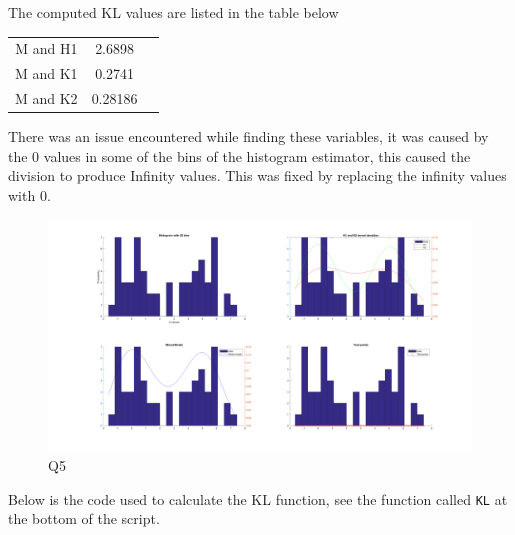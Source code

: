 The computed KL values are listed in the table below
\begin{center}
    \begin{tabular}{|c|c|c|}
        \hline
        M and H1 & 2.6898 \\
        M and K1 & 0.2741  \\
        M and K2 & 0.28186 \\
        \hline
    \end{tabular}
\end{center}

There was an issue encountered while finding these variables, it was caused by the 0 values in some of the bins of the histogram estimator, this caused the division to produce Infinity values. This was fixed by replacing the infinity values with 0.

\begin{figure}[H]
    \includegraphics[width=\linewidth]{../../pracs/week4/images/q5}
    \centering
    \caption{Q5}
\end{figure}

Below is the code used to calculate the KL function, see the function called \texttt{KL} at the bottom of the script.




